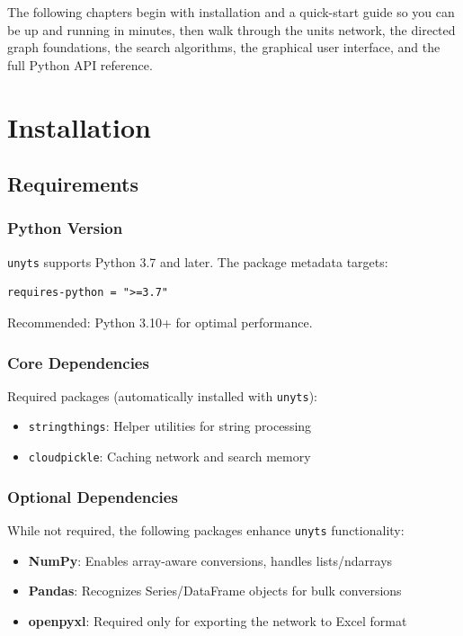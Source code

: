 \documentclass[11pt,a4paper]{report}
\begin{document}
The following chapters begin with installation and a quick-start guide so you can be up and running in minutes, then walk through the units network, the directed graph foundations, the search algorithms, the graphical user interface, and the full Python API reference.

\chapter{Installation}

\section{Requirements}

\subsection{Python Version}
\texttt{unyts} supports Python 3.7 and later. The package metadata targets:
\begin{lstlisting}[style=bashstyle]
requires-python = ">=3.7"
\end{lstlisting}

Recommended: Python 3.10+ for optimal performance.

\subsection{Core Dependencies}

Required packages (automatically installed with \texttt{unyts}):
\begin{itemize}[leftmargin=*]
  \item \texttt{stringthings}: Helper utilities for string processing
  \item \texttt{cloudpickle}: Caching network and search memory
\end{itemize}

\subsection{Optional Dependencies}

While not required, the following packages enhance \texttt{unyts} functionality:
\begin{itemize}[leftmargin=*]
  \item \textbf{NumPy}: Enables array-aware conversions, handles lists/ndarrays
  \item \textbf{Pandas}: Recognizes Series/DataFrame objects for bulk conversions
  \item \textbf{openpyxl}: Required only for exporting the network to Excel format
\end{itemize}
\end{document}
